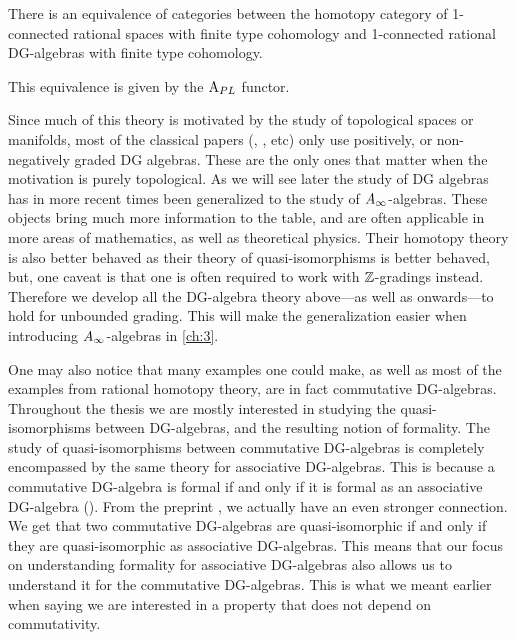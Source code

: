 \begin{theorem}
There is an equivalence of categories between the homotopy category of 1-connected rational spaces with finite type cohomology and 1-connected rational DG-algebras with finite type cohomology. 

This equivalence is given by the $\text{A}_{PL}$ functor. 
\end{theorem}

\begin{remark}
Since much of this theory is motivated by the study of topological spaces or manifolds, most of the classical papers (\cite{DGMS}, \cite{Sullivan}, \cite{PLdeRham} etc) only use positively, or non-negatively graded DG algebras. These are the only ones that matter when the motivation is purely topological. As we will see later the study of DG algebras has in more recent times been generalized to the study of $A_{\infty}$-algebras. These objects bring much more information to the table, and are often applicable in more areas of mathematics, as well as theoretical physics. Their homotopy theory is also better behaved as their theory of quasi-isomorphisms is better behaved, but, one caveat is that one is often required to work with $\mathbb{Z}$-gradings instead. Therefore we develop all the DG-algebra theory above---as well as onwards---to hold for unbounded grading. This will make the generalization easier when introducing $A_{\infty}$-algebras in \cref{ch:3}. 
\end{remark}

One may also notice that many examples one could make, as well as most of the examples from rational homotopy theory, are in fact commutative DG-algebras. Throughout the thesis we are mostly interested in studying the quasi-isomorphisms between DG-algebras, and the resulting notion of formality. The study of quasi-isomorphisms between commutative DG-algebras is completely encompassed by the same theory for associative DG-algebras. This is because a commutative DG-algebra is formal if and only if it is formal as an associative DG-algebra (\cite{Saleh}). From the preprint \cite{Petersen}, we actually have an even stronger connection. We get that two commutative DG-algebras are quasi-isomorphic if and only if they are quasi-isomorphic as associative DG-algebras. This means that our focus on understanding formality for associative DG-algebras also allows us to understand it for the commutative DG-algebras. This is what we meant earlier when saying we are interested in a property that does not depend on commutativity. 

